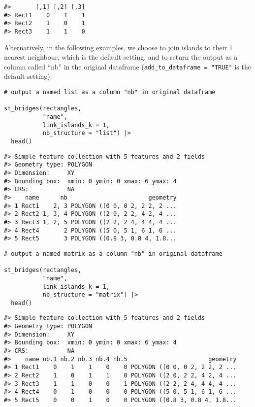 \begin{verbatim}
#>       [,1] [,2] [,3]
#> Rect1    0    1    1
#> Rect2    1    0    1
#> Rect3    1    1    0
\end{verbatim}

Alternatively, in the following examples, we choose to join islands to their 1 nearest
neighbour, which is the default setting, and to return the output as a column called ``nb'' in the original
 dataframe (\texttt{add\_to\_dataframe\ =\ "TRUE"} is the default setting):

\begin{verbatim}
# output a named list as a column "nb" in original dataframe

st_bridges(rectangles, 
           "name", 
           link_islands_k = 1, 
           nb_structure = "list") |> 
  head()
\end{verbatim}

\begin{verbatim}
#> Simple feature collection with 5 features and 2 fields
#> Geometry type: POLYGON
#> Dimension:     XY
#> Bounding box:  xmin: 0 ymin: 0 xmax: 6 ymax: 4
#> CRS:           NA
#>    name      nb                       geometry
#> 1 Rect1    2, 3 POLYGON ((0 0, 0 2, 2 2, 2 ...
#> 2 Rect2 1, 3, 4 POLYGON ((2 0, 2 2, 4 2, 4 ...
#> 3 Rect3 1, 2, 5 POLYGON ((2 2, 2 4, 4 4, 4 ...
#> 4 Rect4       2 POLYGON ((5 0, 5 1, 6 1, 6 ...
#> 5 Rect5       3 POLYGON ((0.8 3, 0.8 4, 1.8...
\end{verbatim}

\begin{verbatim}
# output a named matrix as a column "nb" in original dataframe

st_bridges(rectangles, 
           "name", 
           link_islands_k = 1, 
           nb_structure = "matrix") |> 
  head()
\end{verbatim}

\begin{verbatim}
#> Simple feature collection with 5 features and 2 fields
#> Geometry type: POLYGON
#> Dimension:     XY
#> Bounding box:  xmin: 0 ymin: 0 xmax: 6 ymax: 4
#> CRS:           NA
#>    name nb.1 nb.2 nb.3 nb.4 nb.5                       geometry
#> 1 Rect1    0    1    1    0    0 POLYGON ((0 0, 0 2, 2 2, 2 ...
#> 2 Rect2    1    0    1    1    0 POLYGON ((2 0, 2 2, 4 2, 4 ...
#> 3 Rect3    1    1    0    0    1 POLYGON ((2 2, 2 4, 4 4, 4 ...
#> 4 Rect4    0    1    0    0    0 POLYGON ((5 0, 5 1, 6 1, 6 ...
#> 5 Rect5    0    0    1    0    0 POLYGON ((0.8 3, 0.8 4, 1.8...
\end{verbatim}

